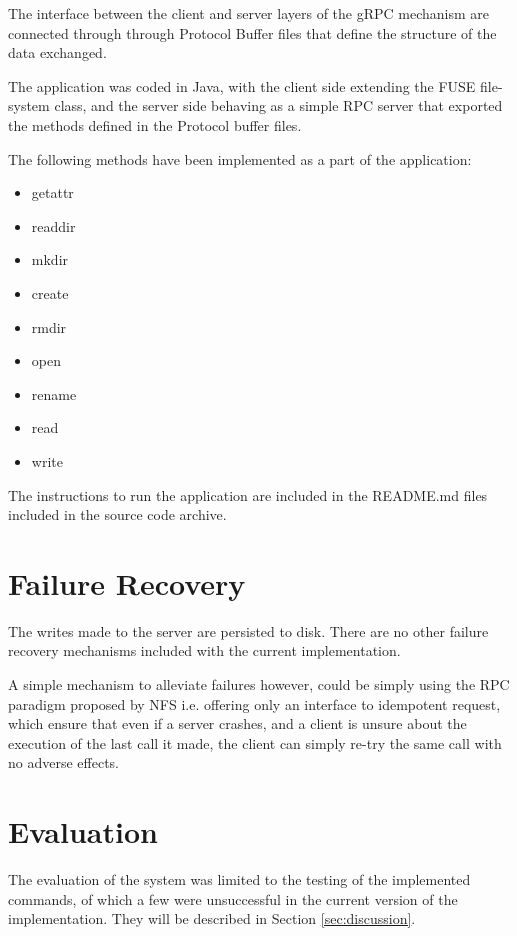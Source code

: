 \documentclass{scrartcl}
\begin{document}
The interface between the client and server layers of the gRPC mechanism are connected through through Protocol Buffer\cite{Protocol27:online} files that define the structure of the data exchanged.

The application was coded in Java, with the client side extending the FUSE file-system class, and the server side behaving as a simple RPC server that exported the methods defined in the Protocol buffer files.

The following methods have been implemented as a part of the application:
\begin{itemize}
    \item 
    getattr
    \item
    readdir
    \item
    mkdir
    \item
    create
    \item
    rmdir
    \item
    open
    \item
    rename
    \item 
    read
    \item 
    write
\end{itemize}

The instructions to run the application are included in the README.md files included in the source code archive.

\section{Failure Recovery} \label{sec:failure-recovery}
The writes made to the server are persisted to disk. There are no other failure recovery mechanisms included with the current implementation.

A simple mechanism to alleviate failures however, could be simply using the RPC paradigm proposed by NFS i.e. offering only an interface to idempotent request, which ensure that even if a server crashes, and a client is unsure about the execution of the last call it made, the client can simply re-try the same call with no adverse effects.

\section{Evaluation} \label{sec:evaluation}
The evaluation of the system was limited to the testing of the implemented commands, of which a few were unsuccessful in the current version of the implementation. They will be described in Section \ref{sec:discussion}.
\end{document}
